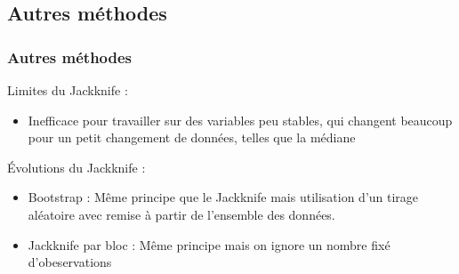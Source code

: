 \documentclass[handout]{beamer}
\begin{document}
		\subsection{Autres méthodes}
		\begin{frame}
			\frametitle{Autres méthodes}
			Limites du Jackknife :
			\begin{itemize}
				\item Inefficace pour travailler sur des variables peu stables, qui changent beaucoup pour un petit changement de données, telles que la médiane
			\end{itemize}
			\vspace{15px}
			Évolutions du Jackknife :
			\begin{itemize}
				\item Bootstrap : Même principe que le Jackknife mais utilisation d'un tirage aléatoire avec remise à partir de l'ensemble des données.
				\item Jackknife par bloc : Même principe mais on ignore un nombre fixé d'obeservations 
			\end{itemize}

		\end{frame}

% 
% 


\end{document}
